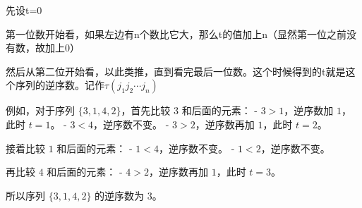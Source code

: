 \documentclass[12.8pt,a4paper,numbering = AMSalpha]{book}
\begin{document}
先设t=0

第一位数开始看，如果左边有n个数比它大，那么t的值加上n（显然第一位之前没有数，故加上0）

然后从第二位开始看，以此类推，直到看完最后一位数。这个时候得到的t就是这个序列的逆序数。记作$\tau(j_1j_2\cdots j_n)$

\vspace{12pt}

例如，对于序列 $\{3,1,4,2\}$，首先比较 $3$ 和后面的元素：
- $3 > 1$，逆序数加 $1$，此时 $t = 1$。
- $3 < 4$，逆序数不变。
- $3 > 2$，逆序数再加 $1$，此时 $t = 2$。

接着比较 $1$ 和后面的元素：
- $1 < 4$，逆序数不变。
- $1 < 2$，逆序数不变。

再比较 $4$ 和后面的元素：
- $4 > 2$，逆序数再加 $1$，此时 $t = 3$。

所以序列 $\{3,1,4,2\}$ 的逆序数为 $3$。

\end{document}
